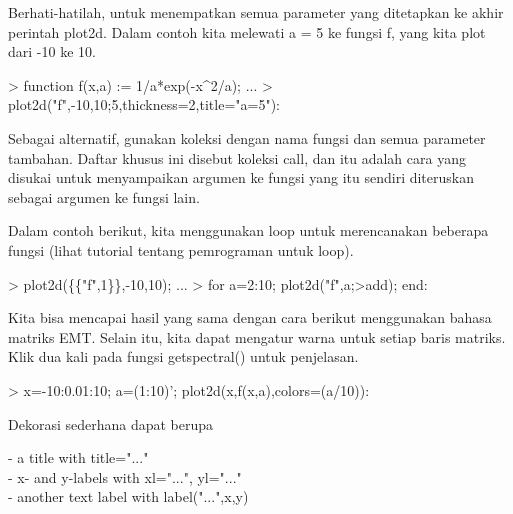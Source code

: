 \documentclass[a4paper,10pt]{article}
\begin{document}
\begin{eulernotebook}
\begin{eulercomment}
\begin{eulercomment}
\begin{eulercomment}
\begin{eulercomment}
\begin{eulercomment}
\begin{eulercomment}
\begin{eulercomment}
Berhati-hatilah, untuk menempatkan semua parameter yang ditetapkan ke
akhir perintah plot2d. Dalam contoh kita melewati a = 5 ke fungsi f,
yang kita plot dari -10 ke 10.
\end{eulercomment}
\begin{eulerprompt}
> function f(x,a) := 1/a*exp(-x^2/a); ...
> plot2d("f",-10,10;5,thickness=2,title="a=5"):
\end{eulerprompt}
\begin{eulercomment}
Sebagai alternatif, gunakan koleksi dengan nama fungsi dan semua
parameter tambahan. Daftar khusus ini disebut koleksi call, dan itu
adalah cara yang disukai untuk menyampaikan argumen ke fungsi yang itu
sendiri diteruskan sebagai argumen ke fungsi lain.

Dalam contoh berikut, kita menggunakan loop untuk merencanakan
beberapa fungsi (lihat tutorial tentang pemrograman untuk loop).
\end{eulercomment}
\begin{eulerprompt}
> plot2d(\{\{"f",1\}\},-10,10); ...
> for a=2:10; plot2d("f",a;>add); end:
\end{eulerprompt}
\begin{eulercomment}
Kita bisa mencapai hasil yang sama dengan cara berikut menggunakan
bahasa matriks EMT. Selain itu, kita dapat mengatur warna untuk setiap
baris matriks. Klik dua kali pada fungsi getspectral() untuk
penjelasan.
\end{eulercomment}
\begin{eulerprompt}
> x=-10:0.01:10; a=(1:10)'; plot2d(x,f(x,a),colors=(a/10)):
\end{eulerprompt}
\begin{eulercomment}
Dekorasi sederhana dapat berupa

- a title with title="..."\\
- x- and y-labels with xl="...", yl="..."\\
- another text label with label("...",x,y)


\end{eulercomment}
\end{eulercomment}
\end{eulercomment}
\end{eulercomment}
\end{eulercomment}
\end{eulercomment}
\end{eulercomment}
\end{eulernotebook}
\end{document}
